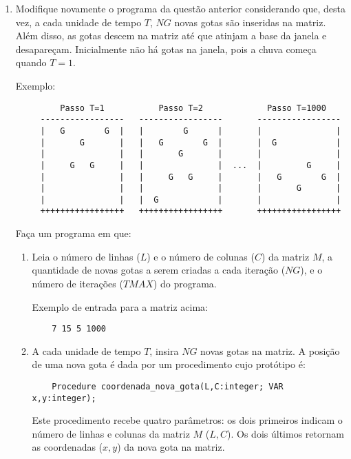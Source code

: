 \begin{enumerate}
\item Modifique novamente o programa da questão anterior considerando que,
desta vez, a 
cada unidade de tempo $T$, $NG$ novas gotas são inseridas na matriz. Além
disso, as gotas descem na matriz até que atinjam a base da janela e desapareçam.
Inicialmente não há gotas na janela, pois a chuva começa quando $T=1$.

\vspace*{0.3cm}
Exemplo:
\begin{small}
\begin{verbatim}
         Passo T=1           Passo T=2             Passo T=1000
     -----------------   -----------------       ----------------- 
     |   G        G  |   |        G      |       |               |
     |       G       |   |   G        G  |       |  G            |
     |               |   |       G       |       |               |
     |     G   G     |   |               |  ...  |         G     |
     |               |   |     G   G     |       |   G        G  |
     |               |   |               |       |       G       |
     |               |   |  G            |       |               |
     +++++++++++++++++   +++++++++++++++++       +++++++++++++++++
\end{verbatim}
\end{small}

Faça um programa em  que:

\begin {enumerate}
\item 
Leia o número de linhas ($L$) e o número de colunas ($C$) da
matriz $M$, a quantidade de novas gotas a serem criadas a cada
iteração ($NG$), e o número de iterações ($TMAX$) do programa.

Exemplo de entrada para a matriz acima:
\begin{small}
\begin{verbatim}
    7 15 5 1000
\end{verbatim}
\end{small}

\item 
A cada unidade de tempo $T$, insira $NG$ novas gotas na matriz. A posição de 
uma nova gota é dada por um procedimento cujo protótipo é:
\begin{verbatim}
    Procedure coordenada_nova_gota(L,C:integer; VAR x,y:integer);
\end{verbatim}
Este procedimento 
recebe quatro parâmetros: os dois primeiros indicam o número de linhas e 
colunas da matriz $M$ ($L,C$). Os dois últimos retornam as coordenadas 
($x,y$) da nova gota na matriz.


\end{enumerate}
\end{enumerate}
